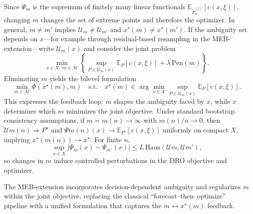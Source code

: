 \documentclass[ijoc,sglanonrev]{informs4}
\begin{document}
Since $\Psi_m$ is the supremum of finitely many linear functionals $\mathbb{E}_{\widehat{P}_n^{(j)}}[c(x,\xi)]$, changing $m$ changes the set of extreme points and therefore the optimizer. In general, $m\neq m'$ implies $\mathcal{U}_m\neq\mathcal{U}_{m'}$ and $x^\star(m)\neq x^\star(m')$.
If the ambiguity set depends on $x$—for example through residual-based resampling in the MEB-extension—write $\mathcal{U}_m(x)$ and consider the joint problem
\begin{equation}
	\min_{x\in X,\; m\in\mathcal{M}}
	\left\{
	\sup_{P\in\mathcal{U}_m(x)} \mathbb{E}_P[c(x,\xi)]
	+ \lambda\,\mathrm{Pen}(m)
	\right\}.
\end{equation}
Eliminating $m$ yields the bilevel formulation
\begin{equation}
	\min_{m\in\mathcal{M}} 
	\Phi(x^\star(m),m)
	\quad\text{s.t.}\quad
	x^\star(m)\in\arg\min_{x\in X}
	\sup_{P\in\mathcal{U}_m(x)}\mathbb{E}_P[c(x,\xi)].
\end{equation}
This expresses the feedback loop: $m$ shapes the ambiguity faced by $x$, while $x$ determines which $m$ minimizes the joint objective.
Under standard bootstrap consistency assumptions, if $m=m(n)\to\infty$ with $m(n)/n\to 0$, then $\mathcal{U}{m(n)}\Rightarrow P^\star$ and $\Psi{m(n)}(x)\to\mathbb{E}_{P^\star}[c(x,\xi)]$ uniformly on compact $X$, implying $x^\star(m(n))\to x^\star$. For finite $n$,
\begin{equation}
	\sup_{x\in X}\big|\Psi_m(x)-\Psi_{m'}(x)\big|
	\le 
	L\,\mathrm{Haus}\!\left(\mathcal{U}m,\mathcal{U}{m'}\right),
\end{equation}
so changes in $m$ induce controlled perturbations in the DRO objective and optimizer.

The MEB-extension incorporates decision-dependent ambiguity and regularizes $m$ within the joint objective, replacing the classical ``forecast--then--optimize'' pipeline with a unified formulation that captures the $m\leftrightarrow x^\star(m)$ feedback.

\end{document}
